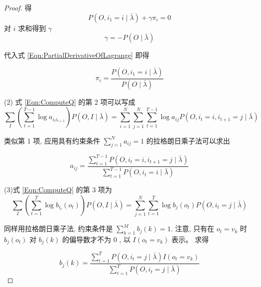 \begin{proof}
得
$$
P\left(O, i_{1}=i \mid \bar{\lambda}\right)+\gamma \pi_{i}=0
$$
对 $ i $ 求和得到 $ \gamma $
$$
\gamma=-P(O \mid \bar{\lambda})
$$

代入式 \ref{Eqn:PartialDerivativeOfLagrange}  即得

\begin{equation}
    \label{Eqn:ComputePI}
\pi_{i}=\frac{P\left(O, i_{1}=i \mid \bar{\lambda}\right)}{P(O \mid \bar{\lambda})}
\end{equation}



(2) 式 \ref{Eqn:ComputeQ} 的第 2 项可以写成
$$
\sum_{I}\left(\sum_{t=1}^{T-1} \log a_{i_t i_{i+1}}\right) P(O, I \mid \bar{\lambda})=\sum_{i=1}^{N} \sum_{j=1}^{N} \sum_{t=1}^{T-1} \log a_{i j} P\left(O, i_{t}=i, i_{t+1}=j \mid \bar{\lambda}\right)
$$

类似第 1 项, 应用具有约束条件 $ \sum_{j=1}^{N} a_{i j}=1 $ 的拉格朗日乘子法可以求出

\begin{equation}
    \label{Eqn:ComputeA}
a_{i j}=\frac{\sum_{t=1}^{T-1} P\left(O, i_{t}=i, i_{t+1}=j \mid \bar{\lambda}\right)}{\sum_{t=1}^{T-1} P\left(O, i_{t}=i \mid \bar{\lambda}\right)} 
\end{equation}




(3)式 \ref{Eqn:ComputeQ} 的第 3 项为
$$
\sum_{I}\left(\sum_{t=1}^{T} \log b_{i_{t}}\left(o_{t}\right)\right) P(O, I \mid \bar{\lambda})=\sum_{j=1}^{N} \sum_{t=1}^{T} \log b_{j}\left(o_{t}\right) P\left(O, i_{t}=j \mid \bar{\lambda}\right)
$$

同样用拉格朗日乘子法, 约束条件是 $ \sum_{k=1}^{M} b_{j}(k)=1 $. 注意, 只有在 $ o_{t}=v_{k} $ 时 $ b_{j}\left(o_{t}\right) $ 对 $ b_{j}(k) $ 的偏导数才不为 0 , 以 $ I\left(o_{t}=v_{k}\right) $ 表示。 求得

\begin{equation}
    \label{Eqn:ComputeB}
 b_{j}(k)=\frac{\sum_{t=1}^{T} P\left(O, i_{t}=j \mid \bar{\lambda}\right) I\left(o_{t}=v_{k}\right)}{\sum_{t=1}^{T} P\left(O, i_{t}=j \mid \bar{\lambda}\right)}
\end{equation}
 

\end{proof}


